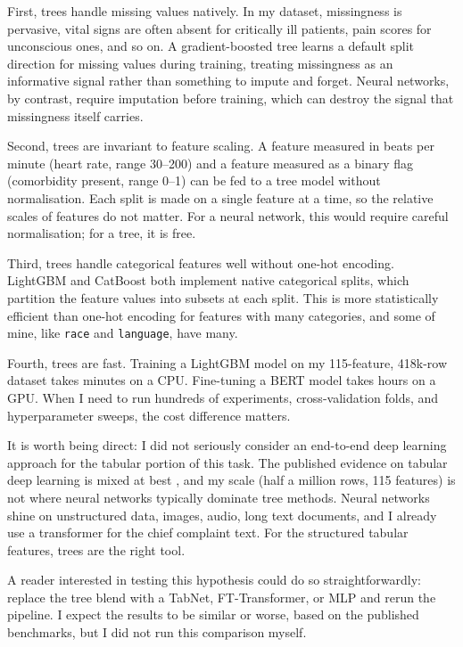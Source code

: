 First, trees handle missing values natively. In my dataset, missingness is pervasive, vital signs are often absent for critically ill patients, pain scores for unconscious ones, and so on. A gradient-boosted tree learns a default split direction for missing values during training, treating missingness as an informative signal rather than something to impute and forget. Neural networks, by contrast, require imputation before training, which can destroy the signal that missingness itself carries.

Second, trees are invariant to feature scaling. A feature measured in beats per minute (heart rate, range 30--200) and a feature measured as a binary flag (comorbidity present, range 0--1) can be fed to a tree model without normalisation. Each split is made on a single feature at a time, so the relative scales of features do not matter. For a neural network, this would require careful normalisation; for a tree, it is free.

Third, trees handle categorical features well without one-hot encoding. LightGBM and CatBoost both implement native categorical splits, which partition the feature values into subsets at each split. This is more statistically efficient than one-hot encoding for features with many categories, and some of mine, like \texttt{race} and \texttt{language}, have many.

Fourth, trees are fast. Training a LightGBM model on my 115-feature, 418k-row dataset takes minutes on a CPU. Fine-tuning a BERT model takes hours on a GPU. When I need to run hundreds of experiments, cross-validation folds, and hyperparameter sweeps, the cost difference matters.

\begin{notebox}
It is worth being direct: I did not seriously consider an end-to-end deep learning approach for the tabular portion of this task. The published evidence on tabular deep learning is mixed at best \citep{grinsztajn2022trees}, and my scale (half a million rows, 115 features) is not where neural networks typically dominate tree methods. Neural networks shine on unstructured data, images, audio, long text documents, and I already use a transformer for the chief complaint text. For the structured tabular features, trees are the right tool.

A reader interested in testing this hypothesis could do so straightforwardly: replace the tree blend with a TabNet, FT-Transformer, or MLP and rerun the pipeline. I expect the results to be similar or worse, based on the published benchmarks, but I did not run this comparison myself.
\end{notebox}

